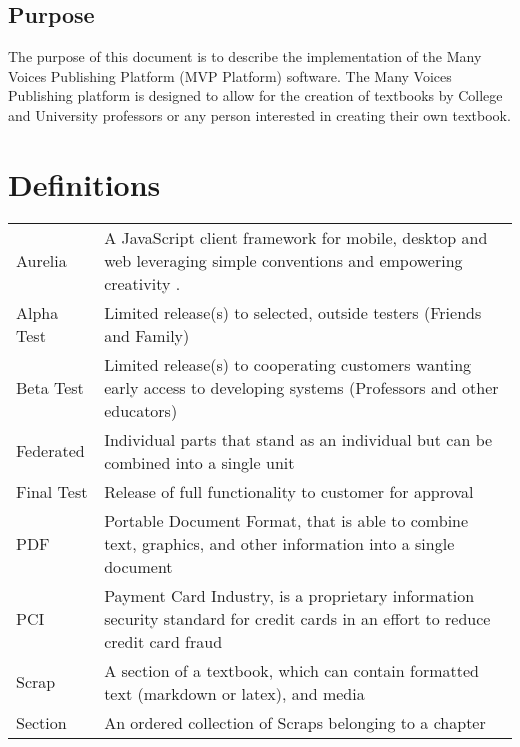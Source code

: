\documentclass[letterpaper, 10pt, draftclsnofoot, compsoc, onecolumn]{IEEEtran}
\begin{document}
\subsection{Purpose}
{\noindent The purpose of this document is to describe the implementation of the Many Voices Publishing Platform (MVP Platform) software. The Many Voices Publishing platform is designed to allow for the creation of textbooks by College and University professors or any person interested in creating their own textbook.\par}


\section{Definitions}
\begin{center}


\begin{supertabular}{p{3cm}p{12cm}}

Aurelia & A JavaScript client framework for mobile, desktop and web leveraging 
	simple conventions and empowering creativity \cite{Aurelia}. \\

Alpha Test & Limited release(s) to selected, outside testers (Friends and Family)\\ 

Beta Test & Limited release(s) to cooperating customers wanting early 
	access to developing systems (Professors and other educators)\\ 
	
Federated & Individual parts that stand as an individual but can be combined into a single unit \\ 

Final Test & Release of full functionality to customer for approval \\ 

PDF & Portable Document Format, that is able to combine text, 
	graphics, and other information into a single document \\ 
	
PCI & Payment Card Industry, is a proprietary information security 
standard for credit cards in an effort to reduce credit card fraud \\ 

Scrap & A section of a textbook, which can contain formatted text (markdown or latex), and media \\ 

Section & An ordered collection of Scraps belonging to a chapter\\ 


\end{supertabular}
\end{center}
\end{document}
